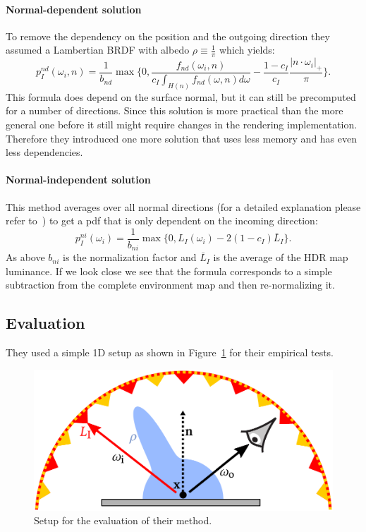 \paragraph{Normal-dependent solution}
\label{par:ibl_normal_dependent}
To remove the dependency on the position and the outgoing direction they assumed a Lambertian BRDF with albedo $ \rho \equiv \frac{1}{\pi} $
which yields:
\begin{equation}
    \label{eq:normal_dependent}
    p_I^{nd}(\omega_i, n) = \frac{1}{b_{nd}} \max\{0, \frac{f_{nd}(\omega_i, n)}{c_I \int_{H(n)} f_{nd}(\omega, n) d\omega} - \frac{1 - c_I}{c_I} \frac{|n \cdot \omega_i|_+}{\pi}\}.
\end{equation}
This formula does depend on the surface normal,
but it can still be precomputed for a number of directions.
Since this solution is more practical than the more general one before it still might require changes in the rendering implementation.
Therefore they introduced one more solution that uses less memory and has even less dependencies.


\paragraph{Normal-independent solution}
\label{par:ibl_normal_independent}
This method averages over all normal directions (for a detailed explanation please refer to~\cite[Appendix~D]{Karlik2019})
to get a pdf that is only dependent on the incoming direction: $$ p_I^{ni}(\omega_i) = \frac{1}{b_{ni}} \max\{0, L_I(\omega_i) - 2 (1 - c_I) \bar{L}_I\}. $$
As above $ b_{ni} $ is the normalization factor and $ \bar{L}_I $ is the average of the HDR map luminance.
If we look close we see that the formula corresponds to a simple subtraction from the complete environment map and then re-normalizing it.


\subsection{Evaluation}
\label{sec:ibl_evalution}
They used a simple 1D setup as shown in Figure~\ref{fig:ibl_setup} for their empirical tests.

\begin{figure}[h]
    \centering
    \includegraphics[width=.4\textwidth]{images/ibl_setup.png}
    \caption{Setup for the evaluation of their method.
    \cite[Figure~3]{Karlik2019}}
    \label{fig:ibl_setup}
\end{figure}

